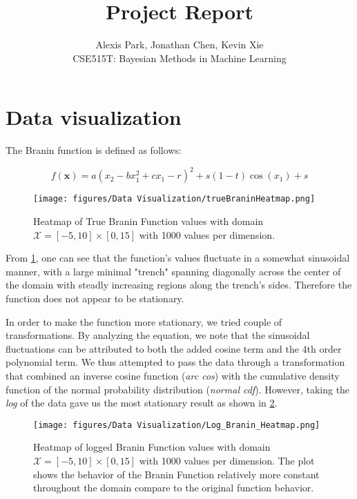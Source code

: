 \documentclass[11pt]{article}
\newcommand{\Course}{CSE515T: Bayesian Methods in Machine Learning}
\newcommand{\mc}[1]{\mathcal{#1}}
\numberwithin{equation}{section}
\begin{document}
\title{Project Report}
\author{Alexis Park, Jonathan Chen, Kevin Xie \\ \Course}

\maketitle

\section*{Data visualization}

The Branin function is defined as follows:

\begin{equation}
  f(\bm{x}) = a(x_2 - bx_1^2 + cx_1 - r)^2 + s(1 - t)\cos(x_1) + s
  \label{eq:branin}
\end{equation}

\begin{figure}[H]
  \centering
  \texttt{[image: figures/Data Visualization/trueBraninHeatmap.png]}
  \caption{Heatmap of True Branin Function values with domain $\mc{X} = [-5, 10] \times [0, 15]$  with 1000 values per dimension.}
  \label{fig:true_branin_heatmap}
\end{figure}

From \ref{fig:true_branin_heatmap}, one can see that the function's values fluctuate in a somewhat sinusoidal manner, with a large minimal "trench" spanning diagonally across the center of the domain with steadly increasing regions along the trench's sides. Therefore the function does not appear to be stationary.

In order to make the function more stationary, we tried couple of transformations. By analyzing the equation, we note that the sinusoidal fluctuations can be attributed to both the added cosine term and the 4th order polynomial term. We thus attempted to pass the data through a transformation that combined an inverse cosine function (\emph{arc cos}) with the cumulative density function of the normal probability distribution (\emph{normal cdf}). However, taking the \emph{log} of the data gave us the most stationary result as shown in \ref{fig:log_branin_heatmap}. 

\begin{figure}[H]
  \centering
  \texttt{[image: figures/Data Visualization/Log\_Branin\_Heatmap.png]}
  \caption{Heatmap of logged Branin Function values with domain $\mc{X} = [-5, 10] \times [0, 15]$  with 1000 values per dimension. The plot shows the behavior of the Branin Function relatively more constant throughout the domain compare to the original function behavior.}
  \label{fig:log_branin_heatmap}
\end{figure}
\end{document}
